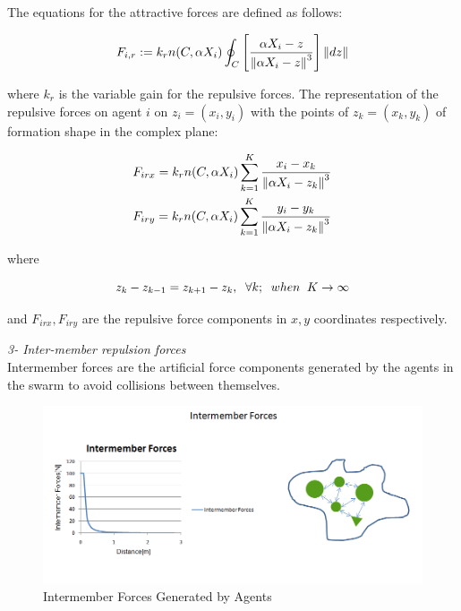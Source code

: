 The equations for the attractive forces are defined as follows:	

\begin{equation}
F_{i,r} := k_r  n(C,\alpha X_i) \oint_C \left[\frac{\alpha X_i - z}{\left\lVert\alpha X_i - z\right\rVert^3}\right] \left\lVert dz\right\rVert
\end{equation}

where $k_r$ is the variable gain for the repulsive forces. The representation of the repulsive forces on agent $i$ on $z_i = (x_i, y_i)$ with the points of  $z_k = (x_k,y_k)$ of formation shape in the complex plane:

\begin{align*}
& F_{irx} = k_r n(C,\alpha X_i)  \sum_{k=1}^{K} \frac{x_i - x_k}{\left\lVert\alpha X_i - z_k\right\rVert^3}\\
& F_{iry} = k_r n(C,\alpha X_i)  \sum_{k=1}^{K} \frac{y_i - y_k}{\left\lVert\alpha X_i - z_k\right\rVert^3}
\end{align*}
				
where

\begin{equation}
z_k - z_{k-1} = z_{k+1} - z_k, \hspace{0.2cm}  \forall k ;  \hspace{0.2cm} when  \hspace{0.2cm} K \to\infty
\end{equation}
						
and $F_{irx} , F_{iry} $ are the repulsive force components in $x,y$ coordinates respectively. \newline
						
\textit{		3- Inter-member repulsion forces} \\ 
Intermember forces are the artificial force components generated by the agents in the swarm to avoid collisions between themselves. 
			
\begin{figure}[H]
\caption{Intermember Forces Generated by Agents}
\centering
\includegraphics[scale = 0.60]{intermember_forces}
\end{figure}
			
